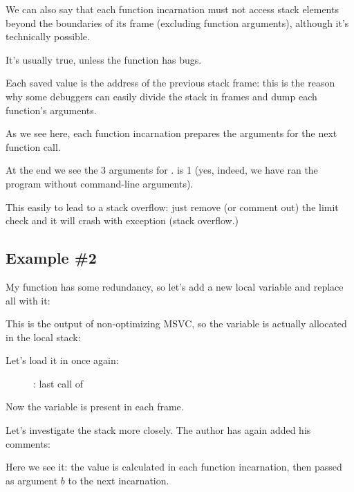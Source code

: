 We can also say that each function incarnation must not access
stack elements beyond the boundaries of its frame (excluding function arguments), 
although it's technically possible. 

It's usually true, unless the function has bugs.

Each saved \EBP value is the address of the previous \gls{stack frame}: 
this is the reason why some debuggers can easily divide the stack in frames and dump each 
function's arguments.

As we see here, each function incarnation prepares the arguments for the next function call.

At the end we see the 3 arguments for \main. 
 is 1 (yes, indeed, we have ran the program without command-line arguments).

This easily to lead to a stack overflow: just remove (or comment out) the limit check and it will crash with
exception  (stack overflow.)

\subsection{Example \#2}

My function has some redundancy, so let's add a new local variable  and replace all  with it:



This is the output of non-optimizing MSVC, so the  variable is actually allocated 
in the local stack:



\clearpage
Let's load it in \olly once again:

\begin{figure}[H]
\centering
{}
\caption{\olly: last call of \ttf{}}
\label{fig:fib_olly2}
\end{figure}

Now the  variable is present in each frame.

\clearpage

Let's investigate the stack more closely. The author has again added his comments:



Here we see it: the  value is calculated in each function incarnation, then passed as
argument $b$ to the next incarnation.

